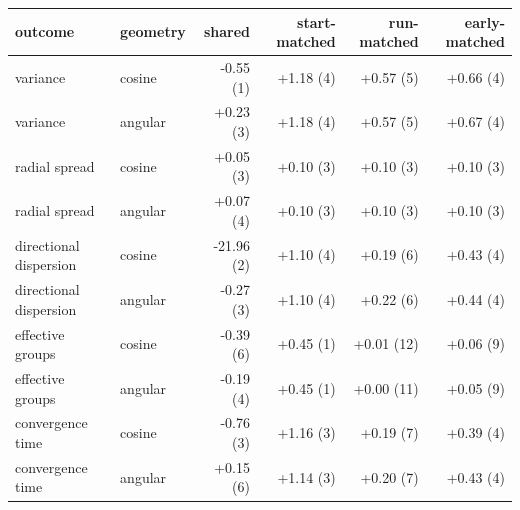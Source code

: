 \begin{tabular}{llrrrr}
\toprule
outcome & geometry & shared & start-matched & run-matched & early-matched \\
\midrule
variance & cosine & -0.55 (1) & +1.18 (4) & +0.57 (5) & +0.66 (4) \\
variance & angular & +0.23 (3) & +1.18 (4) & +0.57 (5) & +0.67 (4) \\
radial spread & cosine & +0.05 (3) & +0.10 (3) & +0.10 (3) & +0.10 (3) \\
radial spread & angular & +0.07 (4) & +0.10 (3) & +0.10 (3) & +0.10 (3) \\
directional dispersion & cosine & -21.96 (2) & +1.10 (4) & +0.19 (6) & +0.43 (4) \\
directional dispersion & angular & -0.27 (3) & +1.10 (4) & +0.22 (6) & +0.44 (4) \\
effective groups & cosine & -0.39 (6) & +0.45 (1) & +0.01 (12) & +0.06 (9) \\
effective groups & angular & -0.19 (4) & +0.45 (1) & +0.00 (11) & +0.05 (9) \\
convergence time & cosine & -0.76 (3) & +1.16 (3) & +0.19 (7) & +0.39 (4) \\
convergence time & angular & +0.15 (6) & +1.14 (3) & +0.20 (7) & +0.43 (4) \\
\bottomrule
\end{tabular}
